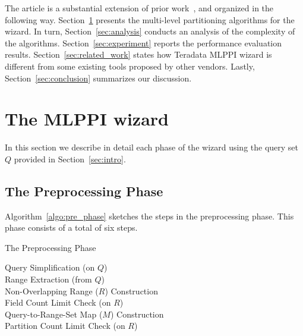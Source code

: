 \documentclass[runningheads]{comsis2}
\begin{document}
The article is a substantial extension of prior work~\cite{Suh12}, 
and organized in the following way. 
Section~\ref{sec:algorithms} presents the multi-level \hbox{partitioning} 
algorithms for the wizard. 
In turn, Section~\ref{sec:analysis} conducts an analysis of the complexity of 
the algorithms. 
Section~\ref{sec:experiment} reports the performance evaluation results. 
Section~\ref{sec:related_work} states how \hbox{Teradata} MLPPI wizard 
is different from some existing tools proposed by other vendors. 
Lastly, Section~\ref{sec:conclusion} summarizes our discussion.

\section{The MLPPI wizard}
\label{sec:algorithms}

In this section we describe in detail each phase of the wizard using the query set $Q$ provided in Section~\ref{sec:intro}. 

\subsection{The Preprocessing Phase}
\label{sec:pre_phase}

Algorithm~\ref{algo:pre_phase} sketches 
the steps in the preprocessing phase. 
This phase consists of a total of six steps. 

\vspace{-.1in}

\begin{algorithm}	
\caption{The Preprocessing Phase}
\label{algo:pre_phase}
{
\hspace{.05in} Query Simplification (on $Q$)\\
\hspace{.05in} Range Extraction (from $Q$) \\
\hspace{.05in} Non-Overlapping Range ($R$) Construction \\
\hspace{.05in} Field Count Limit Check (on $R$) \\
\hspace{.05in} Query-to-Range-Set Map ($M$) Construction \\
\hspace{.05in} Partition Count Limit Check (on $R$) \\
}
\end{algorithm}
\end{document}
